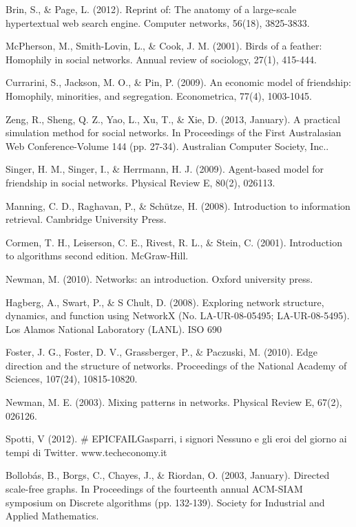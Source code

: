 \documentclass[a4paper,12pt]{article}
\begin{document}
\begin{thebibliography}{9}
  Brin, S., \& Page, L. (2012). Reprint of: The anatomy of a large-scale hypertextual web search engine. Computer networks, 56(18), 3825-3833.

  McPherson, M., Smith-Lovin, L., \& Cook, J. M. (2001). Birds of a feather: Homophily in social networks. Annual review of sociology, 27(1), 415-444.
  
  Currarini, S., Jackson, M. O., \& Pin, P. (2009). An economic model of friendship: Homophily, minorities, and segregation. Econometrica, 77(4), 1003-1045.
  
  Zeng, R., Sheng, Q. Z., Yao, L., Xu, T., \& Xie, D. (2013, January). A practical simulation method for social networks. In Proceedings of the First Australasian Web Conference-Volume 144 (pp. 27-34). Australian Computer Society, Inc..
  
  Singer, H. M., Singer, I., \& Herrmann, H. J. (2009). Agent-based model for friendship in social networks. Physical Review E, 80(2), 026113.

  Manning, C. D., Raghavan, P., \& Schütze, H. (2008). Introduction to information retrieval. Cambridge University Press.
  
  Cormen, T. H., Leiserson, C. E., Rivest, R. L., \& Stein, C. (2001). Introduction to algorithms second edition. McGraw-Hill.
  
  Newman, M. (2010). Networks: an introduction. Oxford university press.
  
  Hagberg, A., Swart, P., \& S Chult, D. (2008). Exploring network structure, dynamics, and function using NetworkX (No. LA-UR-08-05495; LA-UR-08-5495). Los Alamos National Laboratory (LANL).
ISO 690	

  Foster, J. G., Foster, D. V., Grassberger, P., \& Paczuski, M. (2010). Edge direction and the structure of networks. Proceedings of the National Academy of Sciences, 107(24), 10815-10820.
  
  Newman, M. E. (2003). Mixing patterns in networks. Physical Review E, 67(2), 026126.
  
  Spotti, V (2012). \# EPICFAILGasparri, i signori Nessuno e gli eroi del giorno ai tempi di Twitter. www.techeconomy.it
  
  Bollobás, B., Borgs, C., Chayes, J., \& Riordan, O. (2003, January). Directed scale-free graphs. In Proceedings of the fourteenth annual ACM-SIAM symposium on Discrete algorithms (pp. 132-139). Society for Industrial and Applied Mathematics.
\end{thebibliography}
\end{document}
